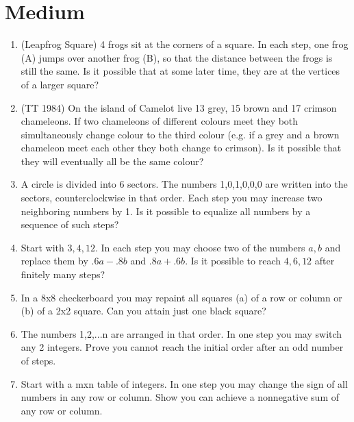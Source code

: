 \documentclass{article}
\begin{document}
\section{Medium}
\begin{enumerate}
\item (Leapfrog Square) 4 frogs sit at the corners of a square. In each step, one frog (A) jumps over another frog (B), so that the distance between the frogs is still the same. Is it possible that at some later time, they are at the vertices of a larger square?
\item (TT 1984) On the island of Camelot live 13 grey, 15 brown and 17 crimson chameleons. If two chameleons of different colours meet they both simultaneously change colour to the third colour (e.g. if a grey and a brown chameleon meet each other they both change to crimson). Is it possible that they will eventually all be the same colour?
\item A circle is divided into 6 sectors. The numbers 1,0,1,0,0,0 are written into the sectors, counterclockwise in that order. Each step you may increase two neighboring numbers by 1. Is it possible to equalize all numbers by a sequence of such steps?
\item Start with ${3,4,12}$. In each step you may choose two of the numbers $a, b$ and replace them by $.6a-.8b$ and $.8a+.6b$. Is it possible to reach ${4,6,12}$ after finitely many steps?
\item In a 8x8 checkerboard you may repaint all squares (a) of a row or column or (b) of a 2x2 square. Can you attain just one black square?
\item The numbers 1,2,...n are arranged in that order. In one step you may switch any 2 integers. Prove you cannot reach the initial order after an odd number of steps.
\item Start with a mxn table of integers. In one step you may change the sign of all numbers in any row or column. Show you can achieve a nonnegative sum of any row or column.

\end{enumerate}
\end{document}
